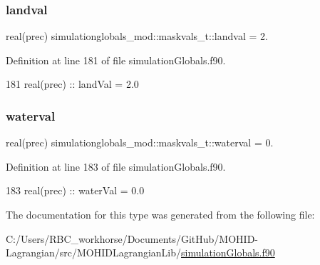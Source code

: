 \subsubsection{\texorpdfstring{landval}{landval}}
{\footnotesize\ttfamily real(prec) simulationglobals\+\_\+mod\+::maskvals\+\_\+t\+::landval = 2.\hspace{0.3cm}{\ttfamily [private]}}



Definition at line 181 of file simulation\+Globals.\+f90.


\begin{DoxyCode}
181         \textcolor{keywordtype}{real(prec)} :: landVal  = 2.0
\end{DoxyCode}
\mbox{\label{structsimulationglobals__mod_1_1maskvals__t_ad37aae6fd7454ee653511020ad79f539}} 
\subsubsection{\texorpdfstring{waterval}{waterval}}
{\footnotesize\ttfamily real(prec) simulationglobals\+\_\+mod\+::maskvals\+\_\+t\+::waterval = 0.\hspace{0.3cm}{\ttfamily [private]}}



Definition at line 183 of file simulation\+Globals.\+f90.


\begin{DoxyCode}
183         \textcolor{keywordtype}{real(prec)} :: waterVal = 0.0
\end{DoxyCode}


The documentation for this type was generated from the following file\+:\begin{DoxyCompactItemize}
\item 
C\+:/\+Users/\+R\+B\+C\+\_\+workhorse/\+Documents/\+Git\+Hub/\+M\+O\+H\+I\+D-\/\+Lagrangian/src/\+M\+O\+H\+I\+D\+Lagrangian\+Lib/\mbox{\hyperlink{simulation_globals_8f90}{simulation\+Globals.\+f90}}\end{DoxyCompactItemize}
